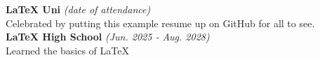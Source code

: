 \documentclass[class=article, crop=false]{standalone}
\begin{document}
\textbf{LaTeX Uni} \textsl{(date of attendance)} \\
Celebrated by putting this example resume up on GitHub for all to see. \\

\textbf{LaTeX High School} \textsl{(Jun. 2025 - Aug. 2028)} \\
Learned the basics of LaTeX \\
\end{document}
